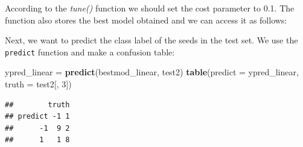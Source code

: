 \documentclass[ignorenonframetext,]{beamer}
\newenvironment{Shaded}{\begin{snugshade}}{\end{snugshade}}
\newcommand{\KeywordTok}[1]{\textcolor[rgb]{0.13,0.29,0.53}{\textbf{#1}}}
\newcommand{\DataTypeTok}[1]{\textcolor[rgb]{0.13,0.29,0.53}{#1}}
\newcommand{\DecValTok}[1]{\textcolor[rgb]{0.00,0.00,0.81}{#1}}
\newcommand{\StringTok}[1]{\textcolor[rgb]{0.31,0.60,0.02}{#1}}
\newcommand{\OperatorTok}[1]{\textcolor[rgb]{0.81,0.36,0.00}{\textbf{#1}}}
\newcommand{\NormalTok}[1]{#1}
\begin{document}
\begin{frame}[fragile]

According to the \emph{tune()} function we should set the cost parameter
to 0.1. The function also stores the best model obtained and we can
access it as follows:

\begin{Shaded}
\end{Shaded}

Next, we want to predict the class label of the seeds in the test set.
We use the \texttt{predict} function and make a confusion table:

\begin{Shaded}
\begin{Highlighting}[]
\NormalTok{ypred_linear =}\StringTok{ }\KeywordTok{predict}\NormalTok{(bestmod_linear, test2)}
\KeywordTok{table}\NormalTok{(}\DataTypeTok{predict =}\NormalTok{ ypred_linear, }\DataTypeTok{truth =}\NormalTok{ test2[, }\DecValTok{3}\NormalTok{])}
\end{Highlighting}
\end{Shaded}

\begin{verbatim}
##        truth
## predict -1 1
##      -1  9 2
##      1   1 8
\end{verbatim}

\end{frame}
\end{document}
